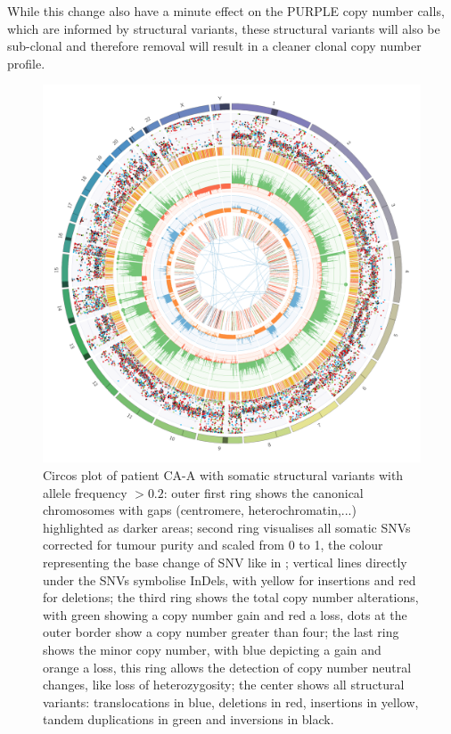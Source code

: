 While this change also have a minute effect on the PURPLE copy number calls, which are informed by structural variants, these structural variants will also be sub-clonal and therefore removal will result in a cleaner clonal copy number profile.


\begin{figure}[ht]
\centering
\includegraphics[width=.99\linewidth]{Figures/CASCADE/CA99/CA99-11.circos.png}
\caption[Circos plot of patient CA-A sample 11]{Circos plot of patient CA-A with somatic structural variants with allele frequency $> 0.2$: outer first ring shows the canonical chromosomes with gaps (centromere, heterochromatin,...) highlighted as darker areas; second ring visualises all somatic SNVs corrected for tumour purity and scaled from 0 to 1, the colour representing the base change of SNV like in \protect\textcite{Alexandrov2013}; vertical lines directly under the SNVs symbolise InDels, with yellow for insertions and red for deletions; the third ring shows the total copy number alterations, with green showing a copy number gain and red a loss, dots at the outer border show a copy number greater than four; the last ring shows the minor copy number, with blue depicting a gain and orange a loss, this ring allows the detection of copy number neutral changes, like loss of heterozygosity; the center shows all structural variants: translocations in blue, deletions in red, insertions in yellow, tandem duplications in green and inversions in black.} \label{fig:ca99.11circos}
\end{figure}


